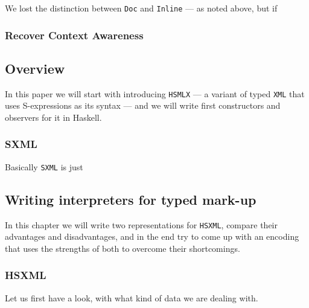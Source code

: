 \documentclass[11pt]{article}
\begin{document}
We lost the distinction between \texttt{Doc} and \texttt{Inline} — as noted above, but if 

\subsubsection{Recover Context Awareness}
\label{sec:org2c02aa0}




























\subsection{Overview}
\label{sec:org2874778}

   In this paper we will start with introducing \texttt{HSMLX} — a variant of typed \texttt{XML}
that uses S-expressions as its syntax — and we will write first constructors and
observers for it in Haskell.

\subsubsection{SXML}
\label{sec:orgeb37498}

Basically \texttt{SXML} is just 

\subsection{Writing interpreters for typed mark-up}
\label{sec:orga297764}

In this chapter we will write two representations for \texttt{HSXML}, compare their
advantages and disadvantages, and in the end try to come up with an encoding
that uses the strengths of both to overcome their shortcomings.

\subsubsection{HSXML}
\label{sec:org7bf1b16}

Let us first have a look, with what kind of data we are dealing with.
\end{document}
